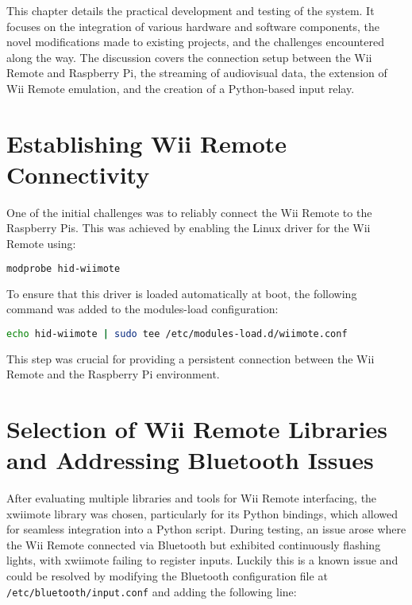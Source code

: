 \label{chapter:implemntation}

This chapter details the practical development and testing of the system. It focuses on the integration of various hardware and software components, the novel modifications made to existing projects, and the challenges encountered along the way. The discussion covers the connection setup between the Wii Remote and Raspberry Pi, the streaming of audiovisual data, the extension of Wii Remote emulation, and the creation of a Python-based input relay.

\section{Establishing Wii Remote Connectivity}

One of the initial challenges was to reliably connect the Wii Remote to the Raspberry Pis. This was achieved by enabling the Linux driver for the Wii Remote using:

\begin{lstlisting}[language=bash]
modprobe hid-wiimote
\end{lstlisting}

To ensure that this driver is loaded automatically at boot, the following command was added to the modules-load configuration:

\begin{lstlisting}[language=bash]
echo hid-wiimote | sudo tee /etc/modules-load.d/wiimote.conf
\end{lstlisting}

This step was crucial for providing a persistent connection between the Wii Remote and the Raspberry Pi environment.

\section{Selection of Wii Remote Libraries and Addressing Bluetooth Issues}

After evaluating multiple libraries and tools for Wii Remote interfacing, the xwiimote\cite{xwiimote} library was chosen, particularly for its Python bindings\cite{xwiimote_bindings}, which allowed for seamless integration into a Python script. During testing, an issue arose where the Wii Remote connected via Bluetooth but exhibited continuously flashing lights, with xwiimote failing to register inputs. Luckily this is a known issue\cite{xwiimote_issue} and could be resolved by modifying the Bluetooth configuration file at \texttt{/etc/bluetooth/input.conf} and adding the following line:

